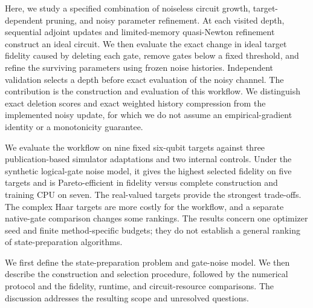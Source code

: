 Here, we study a specified combination of noiseless circuit growth,
target-dependent pruning, and noisy parameter refinement. At each visited
depth, sequential adjoint updates and limited-memory quasi-Newton refinement
construct an ideal circuit. We then evaluate the exact change in ideal
target fidelity caused by deleting each gate, remove gates below a fixed
threshold, and refine the surviving parameters using frozen noise histories.
Independent validation selects a depth before exact evaluation of the noisy
channel. The contribution is the construction and evaluation of this
workflow. We distinguish exact deletion scores and exact weighted history
compression from the implemented noisy update, for which we do not assume
an empirical-gradient identity or a monotonicity guarantee.

We evaluate the workflow on nine fixed six-qubit targets against three
publication-based simulator adaptations and two internal controls. Under
the synthetic logical-gate noise model, it gives the highest selected
fidelity on five targets and is Pareto-efficient in fidelity versus complete
construction and training CPU on seven. The real-valued targets provide the
strongest trade-offs. The complex Haar targets are more costly for the
workflow, and a separate native-gate comparison changes some rankings.
The results concern one optimizer seed and finite method-specific budgets;
they do not establish a general ranking of state-preparation algorithms.

We first define the state-preparation problem and gate-noise model. We then
describe the construction and selection procedure, followed by the numerical
protocol and the fidelity, runtime, and circuit-resource comparisons.
The discussion addresses the resulting scope and unresolved questions.
